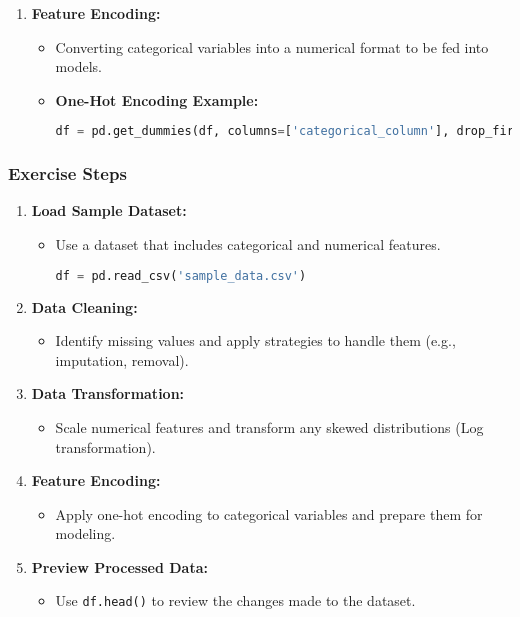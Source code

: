 \documentclass{beamer}
\begin{document}
\begin{frame}[fragile]
\begin{enumerate}
        \item \textbf{Feature Encoding:}
            \begin{itemize}
                \item Converting categorical variables into a numerical format to be fed into models.
                \item \textbf{One-Hot Encoding Example:}
                \begin{lstlisting}[language=Python]
df = pd.get_dummies(df, columns=['categorical_column'], drop_first=True)
                \end{lstlisting}
            \end{itemize}
    \end{enumerate}
\end{frame}

\begin{frame}[fragile]
    \frametitle{Exercise Steps}
    \begin{enumerate}
        \item \textbf{Load Sample Dataset:}
            \begin{itemize}
                \item Use a dataset that includes categorical and numerical features.
                \begin{lstlisting}[language=Python]
df = pd.read_csv('sample_data.csv')
                \end{lstlisting}
            \end{itemize}
        
        \item \textbf{Data Cleaning:}
            \begin{itemize}
                \item Identify missing values and apply strategies to handle them (e.g., imputation, removal).
            \end{itemize}
        
        \item \textbf{Data Transformation:}
            \begin{itemize}
                \item Scale numerical features and transform any skewed distributions (Log transformation).
            \end{itemize}
        
        \item \textbf{Feature Encoding:}
            \begin{itemize}
                \item Apply one-hot encoding to categorical variables and prepare them for modeling.
            \end{itemize}
        
        \item \textbf{Preview Processed Data:}
            \begin{itemize}
                \item Use \texttt{df.head()} to review the changes made to the dataset.
            \end{itemize}
    \end{enumerate}
\end{frame}
\end{document}
